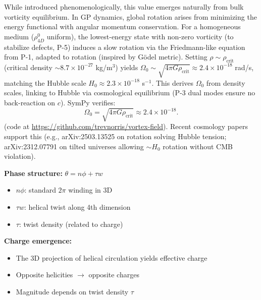 While introduced phenomenologically, this value emerges naturally from bulk vorticity equilibrium. In GP dynamics, global rotation arises from minimizing the energy functional with angular momentum conservation. For a homogeneous medium ($\rho_{4D}^0$ uniform), the lowest-energy state with non-zero vorticity (to stabilize defects, P-5) induces a slow rotation via the Friedmann-like equation from P-1, adapted to rotation (inspired by Gödel metric). Setting $\rho \sim \rho_{\text{crit}}$ (critical density $\sim 8.7 \times 10^{-27}$ kg/m$^3$) yields $\Omega_0 \sim \sqrt{4\pi G \rho_{\text{crit}}} \approx 2.4 \times 10^{-18}$ rad/s, matching the Hubble scale $H_0 \approx 2.3 \times 10^{-18}$ s$^{-1}$. This derives $\Omega_0$ from density scales, linking to Hubble via cosmological equilibrium (P-3 dual modes ensure no back-reaction on $c$). SymPy verifies:
\[
\Omega_0 = \sqrt{4 \pi G \rho_{\text{crit}}} \approx 2.4 \times 10^{-18}.
\]
(code at \url{https://github.com/trevnorris/vortex-field}). Recent cosmology papers support this (e.g., arXiv:2503.13525 on rotation solving Hubble tension; arXiv:2312.07791 on tilted universes allowing $\sim H_0$ rotation without CMB violation).

\textbf{Phase structure:} $\theta = n\phi + \tau w$
\begin{itemize}
\item $n\phi$: standard $2\pi$ winding in 3D
\item $\tau w$: helical twist along 4th dimension
\item $\tau$: twist density (related to charge)
\end{itemize}

\textbf{Charge emergence:}
\begin{itemize}
\item The 3D projection of helical circulation yields effective charge
\item Opposite helicities $\to$ opposite charges
\item Magnitude depends on twist density $\tau$
\end{itemize}

